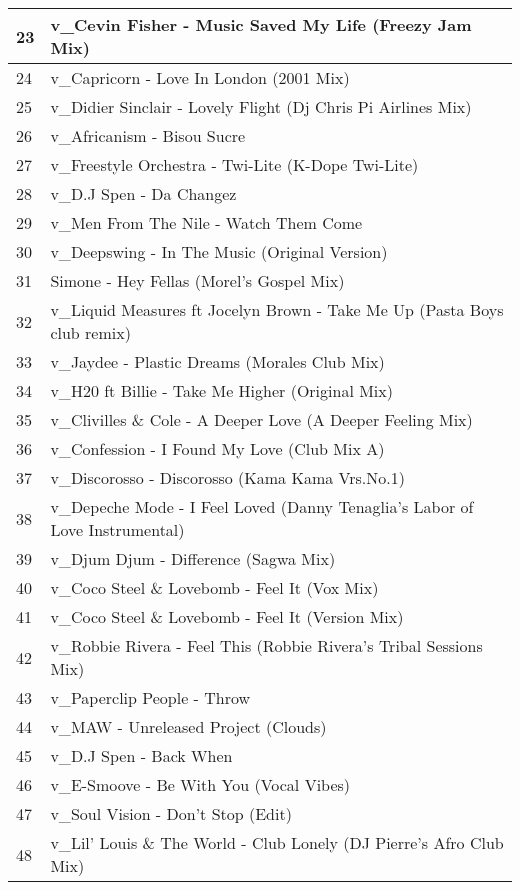 \begin{appendices}
\begin{longtable}{| p{} | p{} |}
23 & v{\_}Cevin Fisher - Music Saved My Life (Freezy Jam Mix)\\
\hline
24 & v{\_}Capricorn - Love In London (2001 Mix)\\
\hline 
25 & v{\_}Didier Sinclair - Lovely Flight (Dj Chris Pi Airlines Mix)\\
\hline
26 & v{\_}Africanism - Bisou Sucre\\
\hline
27 & v{\_}Freestyle Orchestra - Twi-Lite (K-Dope Twi-Lite)\\
\hline
28 & v{\_}D.J Spen - Da Changez\\
\hline
29 & v{\_}Men From The Nile - Watch Them Come\\
\hline
30 & v{\_}Deepswing - In The Music (Original Version)\\
\hline
31 & Simone - Hey Fellas (Morel's Gospel Mix)\\
\hline
32 & v{\_}Liquid Measures ft Jocelyn Brown - Take Me Up (Pasta Boys club remix)\\
\hline
33 & v{\_}Jaydee - Plastic Dreams (Morales Club Mix)\\
\hline
34 & v{\_}H20 ft Billie - Take Me Higher (Original Mix)\\
\hline
35 & v{\_}Clivilles {\&} Cole - A Deeper Love (A Deeper Feeling Mix)\\
\hline
36 & v{\_}Confession - I Found My Love (Club Mix A)\\
\hline
37 & v{\_}Discorosso - Discorosso (Kama Kama Vrs.No.1)\\
\hline 
38 & v{\_}Depeche Mode - I Feel Loved (Danny Tenaglia's Labor of Love Instrumental)\\
\hline
39 & v{\_}Djum Djum - Difference (Sagwa Mix)\\
\hline
40 & v{\_}Coco Steel {\&} Lovebomb - Feel It (Vox Mix)\\
\hline
41 & v{\_}Coco Steel {\&} Lovebomb - Feel It (Version Mix)\\
\hline
42 & v{\_}Robbie Rivera - Feel This (Robbie Rivera's Tribal Sessions Mix)\\
\hline
43 & v{\_}Paperclip People - Throw\\
\hline
44 & v{\_}MAW - Unreleased Project (Clouds)\\
\hline
45 & v{\_}D.J Spen - Back When\\
\hline
46 & v{\_}E-Smoove - Be With You (Vocal Vibes)\\
\hline
47 & v{\_}Soul Vision - Don't Stop (Edit)\\
\hline 
48 & v{\_}Lil' Louis {\&} The World - Club Lonely (DJ Pierre's Afro Club Mix)\\

\end{longtable}
\end{appendices}
